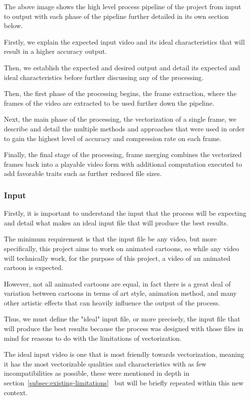 \documentclass[12pt]{article}
\newcommand{\sentence}{} %
\newcommand{\fullref}[1]{\ref{#1}~\nameref{#1}}
\begin{document}
    The above image shows the high level process pipeline of the project from input to output with each phase of the
    pipeline further detailed in its own section below.
    \sentence
    Firstly, we explain the expected input video and its ideal characteristics that will result in a higher accuracy
    output.
    \sentence
    Then, we establish the expected and desired output and detail its expected and ideal characteristics before
    further discussing any of the processing.
    \sentence
    Then, the first phase of the processing begins, the frame extraction, where the frames of the video are
    extracted to be used further down the pipeline.
    \sentence
    Next, the main phase of the processing, the vectorization of a single frame, we describe and detail the multiple methods
    and approaches that were used in order to gain the highest level of accuracy and compression rate on each frame.
    \sentence
    Finally, the final stage of the processing, frame merging combines the vectorized frames back into a playable
    video form with additional computation executed to add favorable traits such as further reduced file sizes.

    \subsubsection{Input}\label{subsubsec:input}

    \tab
    Firstly, it is important to understand the input that the process will be expecting and detail what makes an ideal
    input file that will produce the best results.
    \sentence
    The minimum requirement is that the input file be any video, but more specifically, this project
    aims to work on animated cartoons, so while any video will technically work, for the purpose of this project, a
    video of an animated cartoon is expected.
    \sentence
    However, not all animated cartoons are equal, in fact there is a great deal of variation between cartoons in
    terms of art style, animation method, and many other artistic effects that can heavily influence the output of
    the process.
    \sentence
    Thus, we must define the "ideal" input file, or more precisely, the input file that will produce the best results
    because the process was designed with those files in mind for reasons to do with the limitations of vectorization.
    \sentence
    The ideal input video is one that is most friendly towards vectorization, meaning it has the most vectorizable
    qualities and characteristics with as few incompatibilities as possible, these were mentioned in depth
    in section~\fullref{subsec:existing-limitations} but will be briefly repeated within this new context.
\end{document}
